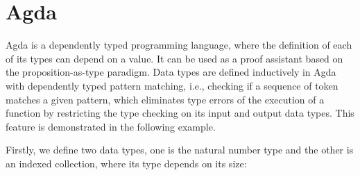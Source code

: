\documentclass{l4proj}
\begin{document}
\section{Agda}
Agda \citep{agda} is a dependently typed programming language, where the definition of each of its types can depend on a value. It can be used as a proof assistant based on the proposition-as-type paradigm. Data types are defined inductively in Agda with dependently typed pattern matching, i.e., checking if a sequence of token matches a given pattern, which eliminates type errors of the execution of a function by restricting the type checking on its input and output data types. This feature is demonstrated in the following example.

Firstly, we define two data types, one is the natural number type and the other is an indexed collection, where its type depends on its size:
\begin{code}%
\>[0]\<%
\\
\>[0]\AgdaSpace{}%
\AgdaSpace{}%
\AgdaSymbol{:}\AgdaSpace{}%
\AgdaSpace{}%
\<%
\\
\>[0][@{}l@{\AgdaIndent{0}}]%
\>[2]\AgdaSpace{}%
\AgdaSymbol{:}\AgdaSpace{}%
\<%
\\
%
\>[2]%
\>[7]\AgdaSymbol{:}\AgdaSpace{}%
\AgdaSpace{}%
\AgdaSpace{}%
\<%
\\
%
\\[\AgdaEmptyExtraSkip]%
\>[0]\<%
\\
\>[0]\AgdaSpace{}%
\AgdaSpace{}%
\AgdaSymbol{(}\AgdaSpace{}%
\AgdaSymbol{:}\AgdaSpace{}%
\AgdaSymbol{)}\AgdaSpace{}%
\AgdaSymbol{:}\AgdaSpace{}%
\AgdaSpace{}%
\AgdaSpace{}%
\AgdaSpace{}%
\<%
\\
\>[0][@{}l@{\AgdaIndent{0}}]%
\>[2]\AgdaInductiveConstructor{[]}%
\>[6]\AgdaSymbol{:}\AgdaSpace{}%
\AgdaSpace{}%
\AgdaSpace{}%
\<%
\\
%
\>[2]\AgdaSpace{}%
\AgdaSymbol{:}\AgdaSpace{}%
\AgdaSymbol{\{}\AgdaSpace{}%
\AgdaSymbol{:}\AgdaSpace{}%
\AgdaSymbol{\}}\AgdaSpace{}%
\AgdaSpace{}%
\AgdaSpace{}%
\AgdaSpace{}%
\AgdaSpace{}%
\AgdaSpace{}%
\AgdaSpace{}%
\AgdaSpace{}%
\AgdaSpace{}%
\AgdaSpace{}%
\AgdaSymbol{(}\AgdaSpace{}%
\AgdaSymbol{)}\<%
\end{code}
\end{document}
